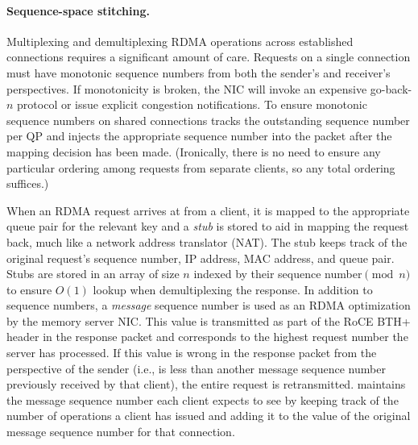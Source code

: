 \paragraph{Sequence-space stitching.}

Multiplexing and demultiplexing RDMA operations across established
connections requires a significant amount of care. Requests on a
single connection must have monotonic sequence numbers from both the
sender's and receiver's perspectives. If monotonicity is broken, the
NIC will invoke an expensive go-back-$n$ protocol or issue explicit
congestion notifications. To ensure monotonic sequence numbers on
shared connections {\sword} tracks the outstanding sequence number per QP and
injects the appropriate sequence number into the packet after the
mapping decision has been made.  (Ironically, there is no need to
ensure any particular ordering among requests from separate clients, so
any total ordering suffices.)

When an RDMA request arrives at {\sword} from a client, it is
mapped to the appropriate queue pair for the relevant key and a
\emph{stub} is stored to aid in mapping the request back, much like a
network address translator (NAT). The stub keeps track of the original
request's sequence number, IP address, MAC address, and queue
pair. Stubs are stored in an array of size $n$ indexed by their
sequence number$\pmod n$ to ensure $O(1)$ lookup when demultiplexing
the response.
In addition to sequence numbers, a \emph{message} sequence number
is used as an RDMA optimization by the memory server NIC. This value
is transmitted as part of the RoCE BTH+ header in the response packet
and corresponds to the highest request number the server has
processed. If this value is wrong in the response packet from the
perspective of the sender (i.e., is less than another message sequence
number previously received by that client), the entire request is
retransmitted.  {\sword} maintains the message sequence number each client
expects to see by keeping track of the number of operations a client has
issued and adding it to the value of the original message sequence
number for that connection.


